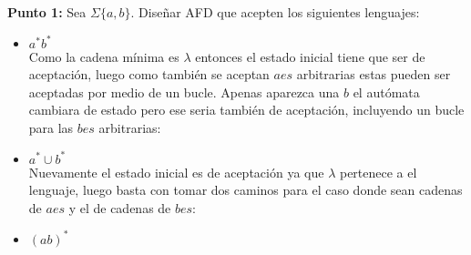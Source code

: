 \textbf{Punto 1: }Sea $\Sigma\{a,b\}.$ Diseñar AFD que acepten los siguientes lenguajes:
\begin{itemize}[label={$\bullet$}]
    \item $a^*b^*$\\

     Como la cadena mínima es $\lambda$ entonces el estado inicial tiene que ser de aceptación, luego como también se aceptan $aes$ arbitrarias estas pueden ser aceptadas por medio de un bucle. Apenas aparezca una $b$ el autómata cambiara de estado pero ese seria también de aceptación, incluyendo un bucle para las $bes$ arbitrarias:\\
    \begin{basedtikz}
    \centering
    \end{basedtikz}

    \item $a^*\cup b^*$\\

     Nuevamente el estado inicial es de aceptación ya que $\lambda$ pertenece a el lenguaje, luego basta con tomar dos caminos para el caso donde sean cadenas de $aes$ y el de cadenas de $bes$:

      
    \begin{basedtikz}
    \centering
    \end{basedtikz}

    \item $(ab)^*$\\


\end{itemize}
